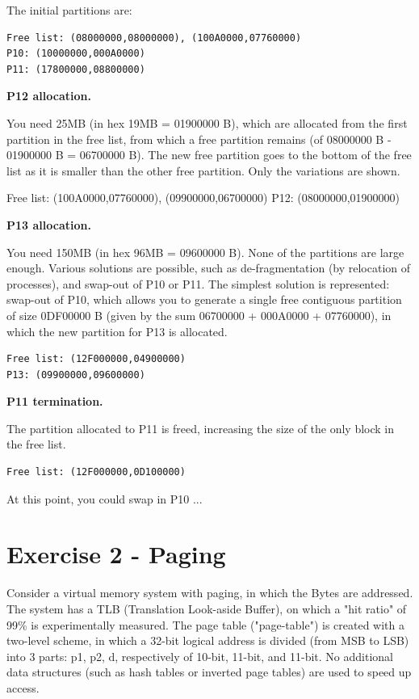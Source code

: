 The initial partitions are:

\begin{verbatim}
Free list: (08000000,08000000), (100A0000,07760000)
P10: (10000000,000A0000)
P11: (17800000,08800000)
\end{verbatim}

\textbf{P12 allocation.} 

You need 25MB (in hex 19MB = 01900000 B), which are allocated from the first partition in the free list, from which a free partition remains (of 08000000 B - 01900000 B = 06700000 B). The new free partition goes to the bottom of the free list as it is smaller than the other free partition. Only the variations are shown.

Free list: (100A0000,07760000), (09900000,06700000)
P12: (08000000,01900000)

\textbf{P13 allocation.}  

You need 150MB (in hex 96MB = 09600000 B). None of the partitions are large enough. Various solutions are possible, such as de-fragmentation (by relocation of processes), and swap-out of P10 or P11. The simplest solution is represented: swap-out of P10, which allows you to generate a single free contiguous partition of size 0DF00000 B (given by the sum 06700000 + 000A0000 + 07760000), in which the new partition for P13 is allocated.

\begin{verbatim}
Free list: (12F000000,04900000)
P13: (09900000,09600000) 
\end{verbatim}


\textbf{P11 termination.}

The partition allocated to P11 is freed, increasing the size of the only block in the free list.

\begin{verbatim}
Free list: (12F000000,0D100000)
\end{verbatim}

At this point, you could swap in P10 ...

\section{Exercise 2 - Paging}

Consider a virtual memory system with paging, in which the Bytes are addressed. The system has a TLB (Translation Look-aside Buffer), on which a "hit ratio" of 99\% is experimentally measured. The page table ("page-table") is created with a two-level scheme, in which a 32-bit logical address is divided (from MSB to LSB) into 3 parts: p1, p2, d, respectively of 10-bit, 11-bit, and 11-bit. No additional data structures (such as hash tables or inverted page tables) are used to speed up access.

